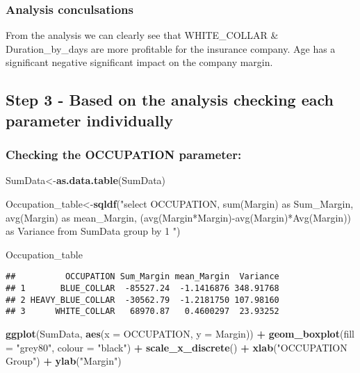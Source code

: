 \documentclass[]{article}
\newenvironment{Shaded}{\begin{snugshade}}{\end{snugshade}}
\newcommand{\KeywordTok}[1]{\textcolor[rgb]{0.13,0.29,0.53}{\textbf{#1}}}
\newcommand{\DataTypeTok}[1]{\textcolor[rgb]{0.13,0.29,0.53}{#1}}
\newcommand{\StringTok}[1]{\textcolor[rgb]{0.31,0.60,0.02}{#1}}
\newcommand{\OperatorTok}[1]{\textcolor[rgb]{0.81,0.36,0.00}{\textbf{#1}}}
\newcommand{\NormalTok}[1]{#1}
\begin{document}
\subsubsection{Analysis conculsations}\label{analysis-conculsations}

From the analysis we can clearly see that WHITE\_COLLAR \&
Duration\_by\_days are more profitable for the insurance company. Age
has a significant negative significant impact on the company margin.

\subsection{Step 3 - Based on the analysis checking each parameter
individually}\label{step-3---based-on-the-analysis-checking-each-parameter-individually}

\subsubsection{Checking the OCCUPATION
parameter:}\label{checking-the-occupation-parameter}

\begin{Shaded}
\begin{Highlighting}[]
\NormalTok{SumData<-}\KeywordTok{as.data.table}\NormalTok{(SumData)}

\NormalTok{Occupation_table<-}\KeywordTok{sqldf}\NormalTok{(}\StringTok{"select OCCUPATION, sum(Margin) as Sum_Margin, avg(Margin) as mean_Margin, (avg(Margin*Margin)-avg(Margin)*Avg(Margin)) as Variance}
\StringTok{                        from SumData group by 1 "}\NormalTok{)}

\NormalTok{Occupation_table}
\end{Highlighting}
\end{Shaded}

\begin{verbatim}
##          OCCUPATION Sum_Margin mean_Margin  Variance
## 1       BLUE_COLLAR  -85527.24  -1.1416876 348.91768
## 2 HEAVY_BLUE_COLLAR  -30562.79  -1.2181750 107.98160
## 3      WHITE_COLLAR   68970.87   0.4600297  23.93252
\end{verbatim}

\begin{Shaded}
\begin{Highlighting}[]
\KeywordTok{ggplot}\NormalTok{(SumData, }\KeywordTok{aes}\NormalTok{(}\DataTypeTok{x =}\NormalTok{ OCCUPATION, }\DataTypeTok{y =}\NormalTok{ Margin)) }\OperatorTok{+}
\StringTok{  }\KeywordTok{geom_boxplot}\NormalTok{(}\DataTypeTok{fill =} \StringTok{"grey80"}\NormalTok{, }\DataTypeTok{colour =} \StringTok{"black"}\NormalTok{) }\OperatorTok{+}
\StringTok{  }\KeywordTok{scale_x_discrete}\NormalTok{() }\OperatorTok{+}\StringTok{ }\KeywordTok{xlab}\NormalTok{(}\StringTok{"OCCUPATION Group"}\NormalTok{) }\OperatorTok{+}
\StringTok{  }\KeywordTok{ylab}\NormalTok{(}\StringTok{"Margin"}\NormalTok{)}
\end{Highlighting}
\end{Shaded}
\end{document}
